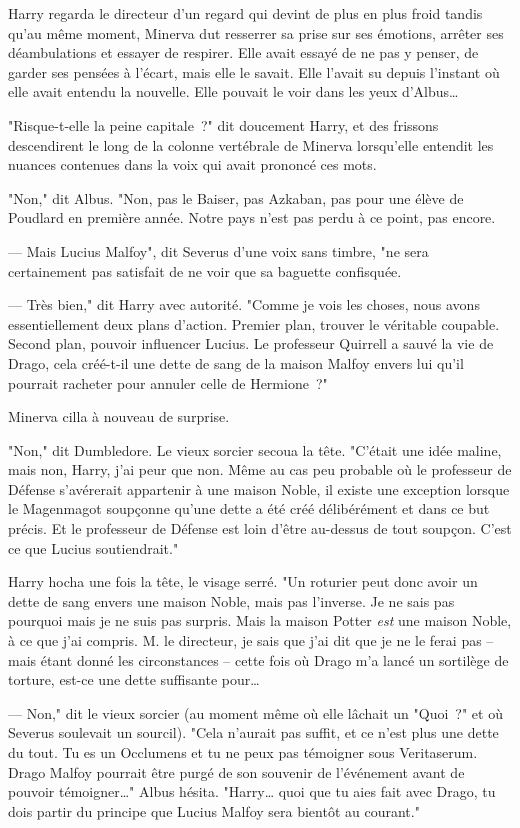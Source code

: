 Harry regarda le directeur d'un regard qui devint de plus en plus froid tandis qu'au même moment, Minerva dut resserrer sa prise sur ses émotions, arrêter ses déambulations et essayer de respirer. Elle avait essayé de ne pas y penser, de garder ses pensées à l'écart, mais elle le savait. Elle l'avait su depuis l'instant où elle avait entendu la nouvelle. Elle pouvait le voir dans les yeux d'Albus…

"Risque-t-elle la peine capitale~?" dit doucement Harry, et des frissons descendirent le long de la colonne vertébrale de Minerva lorsqu'elle entendit les nuances contenues dans la voix qui avait prononcé ces mots.

"Non," dit Albus. "Non, pas le Baiser, pas Azkaban, pas pour une élève de Poudlard en première année. Notre pays n'est pas perdu à ce point, pas encore.

--- Mais Lucius Malfoy", dit Severus d'une voix sans timbre, "ne sera certainement pas satisfait de ne voir que sa baguette confisquée.

--- Très bien," dit Harry avec autorité. "Comme je vois les choses, nous avons essentiellement deux plans d'action. Premier plan, trouver le véritable coupable. Second plan, pouvoir influencer Lucius. Le professeur Quirrell a sauvé la vie de Drago, cela créé-t-il une dette de sang de la maison Malfoy envers lui qu'il pourrait racheter pour annuler celle de Hermione~?"

Minerva cilla à nouveau de surprise.

"Non," dit Dumbledore. Le vieux sorcier secoua la tête. "C'était une idée maline, mais non, Harry, j'ai peur que non. Même au cas peu probable où le professeur de Défense s'avérerait appartenir à une maison Noble, il existe une exception lorsque le Magenmagot soupçonne qu'une dette a été créé délibérément et dans ce but précis. Et le professeur de Défense est loin d'être au-dessus de tout soupçon. C'est ce que Lucius soutiendrait."

Harry hocha une fois la tête, le visage serré. "Un roturier peut donc avoir un dette de sang envers une maison Noble, mais pas l'inverse. Je ne sais pas pourquoi mais je ne suis pas surpris. Mais la maison Potter \emph{est} une maison Noble, à ce que j'ai compris. M. le directeur, je sais que j'ai dit que je ne le ferai pas -- mais étant donné les circonstances -- cette fois où Drago m'a lancé un sortilège de torture, est-ce une dette suffisante pour…

--- Non," dit le vieux sorcier (au moment même où elle lâchait un "Quoi~?" et où Severus soulevait un sourcil). "Cela n'aurait pas suffit, et ce n'est plus une dette du tout. Tu es un Occlumens et tu ne peux pas témoigner sous Veritaserum. Drago Malfoy pourrait être purgé de son souvenir de l'événement avant de pouvoir témoigner…" Albus hésita. "Harry… quoi que tu aies fait avec Drago, tu dois partir du principe que Lucius Malfoy sera bientôt au courant."

